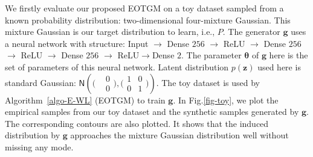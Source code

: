 {We firstly evaluate our proposed EOTGM on a toy dataset sampled from a known probability
  distribution: two-dimensional four-mixture Gaussian. This mixture Gaussian is our target distribution to learn, i.e., $P$. The generator $\bm{g}$ uses a neural network with structure: Input $\rightarrow$ Dense $256$ $\rightarrow$ ReLU $\rightarrow$ Dense $256$ $\rightarrow$ ReLU $\rightarrow$ Dense $256$ $\rightarrow$ ReLU$\rightarrow$Dense $2$. The parameter $\bm{\theta} $ of $\bm{g}$ here is the set of parameters of this neural network. Latent distribution $p(\bm{z})$ used here is standard Gaussian: $\mathsf{N}\left(\bigl(\begin{smallmatrix}& 0\\
    &0\end{smallmatrix}\bigr) ,\bigl( \begin{smallmatrix}1 & 0\\ 0 &
    1\end{smallmatrix}  \bigr)\right)$.
The toy dataset is used by Algorithm~\autoref{algo-E-WL} (EOTGM) to train $\bm{g}$. In Fig.\ref{fig-toy}, we plot the empirical samples from our toy dataset and the synthetic samples generated by $\bm{g}$. The corresponding contours are also plotted. It shows that the induced distribution by $\bm{g}$ approaches the mixture Gaussian distribution well without missing any mode.}          
